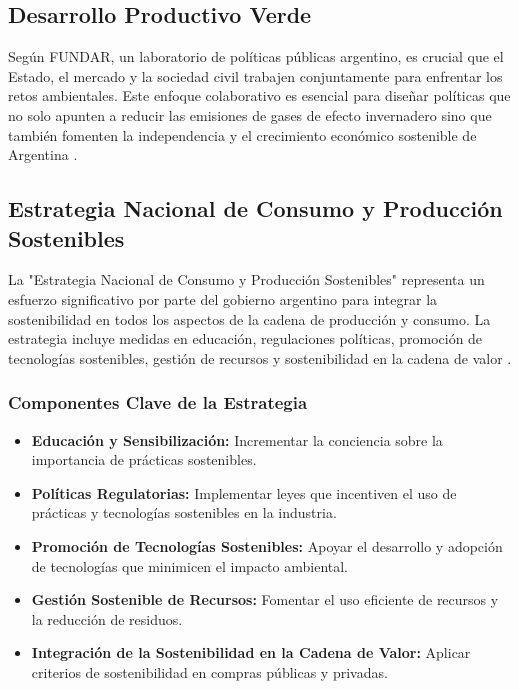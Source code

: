 \documentclass[main.tex]{subfiles}
\begin{document}
\subsection{Desarrollo Productivo Verde}

Según FUNDAR, un laboratorio de políticas públicas argentino, es crucial que el Estado, el mercado y la sociedad civil trabajen conjuntamente para enfrentar los retos ambientales. Este enfoque colaborativo es esencial para diseñar políticas que no solo apunten a reducir las emisiones de gases de efecto invernadero sino que también fomenten la independencia y el crecimiento económico sostenible de Argentina \cite{dormido2021fundar}.

\subsection{Estrategia Nacional de Consumo y Producción Sostenibles}

La "Estrategia Nacional de Consumo y Producción Sostenibles" representa un esfuerzo significativo por parte del gobierno argentino para integrar la sostenibilidad en todos los aspectos de la cadena de producción y consumo. La estrategia incluye medidas en educación, regulaciones políticas, promoción de tecnologías sostenibles, gestión de recursos y sostenibilidad en la cadena de valor \cite{sostenible2021argentina}.

\subsubsection{Componentes Clave de la Estrategia}

\begin{itemize}
    \item \textbf{Educación y Sensibilización:} Incrementar la conciencia sobre la importancia de prácticas sostenibles.
    \item \textbf{Políticas Regulatorias:} Implementar leyes que incentiven el uso de prácticas y tecnologías sostenibles en la industria.
    \item \textbf{Promoción de Tecnologías Sostenibles:} Apoyar el desarrollo y adopción de tecnologías que minimicen el impacto ambiental.
    \item \textbf{Gestión Sostenible de Recursos:} Fomentar el uso eficiente de recursos y la reducción de residuos.
    \item \textbf{Integración de la Sostenibilidad en la Cadena de Valor:} Aplicar criterios de sostenibilidad en compras públicas y privadas.
\end{itemize}
\end{document}
